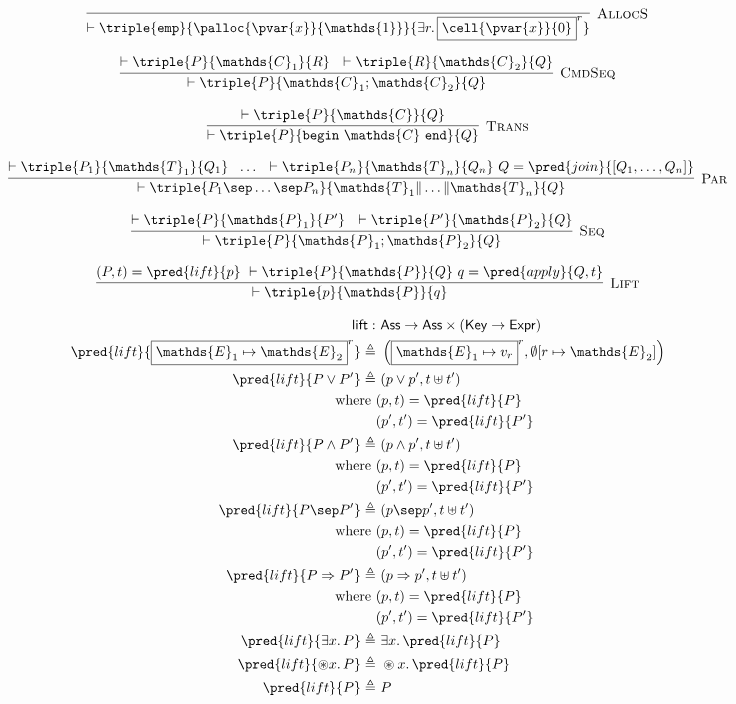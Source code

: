 \[
\infer[\textsc{AllocS}]
{
	\vdash \triple
	{\mathtt{emp}}
	{\palloc{\pvar{x}}{\mathds{1}}}
	{\exists r \ldotp \boxed{\cell{\pvar{x}}{0}}^r}
}
{}
\]

\[
\infer[\textsc{CmdSeq}]
{
	\vdash \triple
	{P}
	{\mathds{C}_1; \mathds{C}_2}
	{Q}
}
{
	\vdash \triple
	{P}
	{\mathds{C}_1}
	{R}\ \
	\vdash \triple
	{R}
	{\mathds{C}_2}
	{Q}
}
\]

\[
\infer[\textsc{Trans}]
{
	\vdash \triple
	{P}
	{\mathtt{begin}\ \mathds{C}\ \mathtt{end}}
	{Q}
}
{
	\vdash \triple
	{P}
	{\mathds{C}}
	{Q}
}
\]

\[
\infer[\textsc{Par}]
{
	\vdash \triple
	{P_1 \sep \ldots \sep P_n}
	{\mathds{T}_1 \| \ldots \| \mathds{T}_n}
	{Q}
}
{
	\vdash \triple
	{P_1}
	{\mathds{T}_1}
	{Q_1}\ \
	\ldots\ \
	\vdash \triple
	{P_n}
	{\mathds{T}_n}
	{Q_n}\
	Q = \pred{join}{[Q_1, \ldots, Q_n]}
}
\]

\[
\infer[\textsc{Seq}]
{
	\vdash \triple
	{P}
	{\mathds{P}_1; \mathds{P}_2}
	{Q}
}
{
	\vdash \triple
	{P}
	{\mathds{P}_1}
	{P'}\ \
	\vdash \triple
	{P'}
	{\mathds{P}_2}
	{Q}
}
\]

\[
\infer[\textsc{Lift}]
{
	\vdash \triple
	{p}
	{\mathds{P}}
	{q}
}
{
	(P, t) = \pred{lift}{p}\
	\vdash \triple
	{P}
	{\mathds{P}}
	{Q}\
	q = \pred{apply}{Q, t}
}
\]

\begin{align*}
\mathsf{lift} :&\ \mathsf{Ass} \rightarrow \mathsf{Ass} \times (\mathsf{Key} \rightarrow \mathsf{Expr}) \\
\pred{lift}{\boxed{\mathds{E}_1 \mapsto \mathds{E}_2}^r} \triangleq&\ \left( \boxed{\mathds{E}_1 \mapsto v_r}^r, \emptyset[r \mapsto \mathds{E}_2] \right) \\
\pred{lift}{P \lor P'} \triangleq&\ (p \lor p', t \uplus t') \\
	\text{where }& (p, t) = \pred{lift}{P} \\
		& (p', t') = \pred{lift}{P'} \\
\pred{lift}{P \land P'} \triangleq&\ (p \land p', t \uplus t') \\
	\text{where }& (p, t) = \pred{lift}{P} \\
		& (p', t') = \pred{lift}{P'} \\
\pred{lift}{P \sep P'} \triangleq&\ (p \sep p', t \uplus t') \\
	\text{where }& (p, t) = \pred{lift}{P} \\
		& (p', t') = \pred{lift}{P'} \\
\pred{lift}{P \Rightarrow P'} \triangleq&\ (p \Rightarrow p', t \uplus t') \\
	\text{where }& (p, t) = \pred{lift}{P} \\
		& (p', t') = \pred{lift}{P'} \\
\pred{lift}{\exists x \ldotp P} \triangleq&\ \exists x \ldotp \pred{lift}{P} \\
\pred{lift}{\circledast x \ldotp P} \triangleq&\ \circledast x \ldotp \pred{lift}{P} \\
\pred{lift}{P} \triangleq&\ P
\end{align*}


